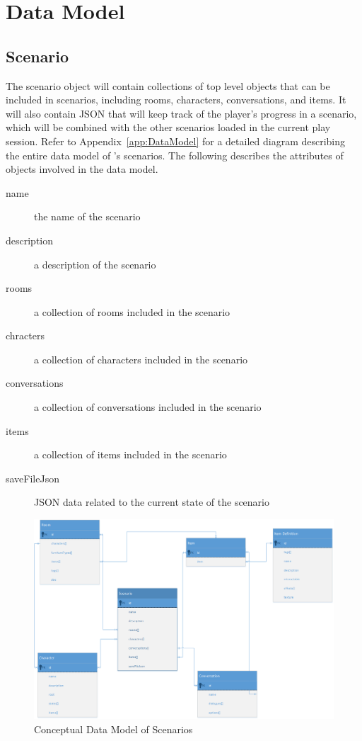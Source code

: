 \section{Data Model}
\subsection{Scenario}
The scenario object will contain collections of top level objects that can be included in scenarios, including rooms, characters, conversations, and items. It will also contain JSON that will keep track of the player's progress in a scenario, which will be combined with the  other scenarios loaded in the current play session. Refer to Appendix~\ref{app:DataModel} for a detailed diagram describing the entire data model of \ourgame{}'s scenarios. The following describes the attributes of objects involved in the data model.

\begin{description}
\item[name]{the name of the scenario}
\item[description]{a description of the scenario}
\item[rooms]{a collection of rooms included in the scenario}
\item[chracters]{a collection of characters included in the scenario}
\item[conversations]{a collection of conversations included in the scenario}
\item[items]{a collection of items included in the scenario}
\item[saveFileJson]{JSON data related to the current state of the scenario}
\end{description}

\begin{figure}[H]
\label{fig:conceptual_data_model}
\centering\includegraphics[width=.7\linewidth]{images/Conceptual_DataModel}
\caption{Conceptual Data Model of Scenarios}
\end{figure}

